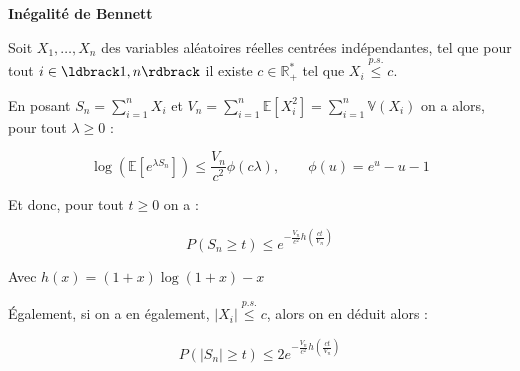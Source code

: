 \documentclass[12pt]{article}
\newcommand{\petitespace}{\vspace{0.5cm}}
\newcommand{\bb}[1]{\mathbb{#1}} %
\newcommand{\R}{\bb{R}} %
\newcommand{\somme}[2]{\sum\limits_{#1}^{#2}}
\newcommand{\Xunan}{X_1,\ldots,X_n} %
\newcommand{\esp}[1]{\bb{ E} \mathopen{}\left[#1\right]} %
\newcommand{\Var}[1]{\bb{ V} \mathopen{}\left(#1\right)} %
\newcommand{\1}{\bb{1}} %
\begin{document}
\textbf{Inégalité de Bennett}\petitespace

Soit $\Xunan$ des variables aléatoires réelles centrées indépendantes, tel que pour tout $i \in \ldbrack 1,n\rdbrack$ il existe $c\in \R_+^*$ tel que $X_i \overset{p.s.}{\le} c$. 

En posant $S_n = \somme{i=1}{n} X_i$ et $V_n = \somme{i=1}{n} \esp{X_i^2} =  \somme{i=1}{n} \Var{X_i} $ on a alors, pour tout $\lambda \ge 0$ :

$$\log(\esp{e^{\lambda S_n}} )  \le \frac{V_n}{c^2}\phi(c\lambda), \quad \quad \phi(u) = e^{u}-u-1 $$

Et donc, pour tout $t \ge 0$ on a :

$$P(S_n \ge t ) \le e^{-\frac{V_n}{c^2}h(\frac{ct}{V_n})}$$

Avec $h(x) = (1+x)\log(1+x)-x$\petitespace

Également, si on a en également, $|X_i|  \overset{p.s.}{\le} c$, alors on en déduit alors :

$$P(| S_n | \ge t ) \le 2e^{-\frac{V_n}{c^2}h(\frac{ct}{V_n})} $$




\petitespace
\end{document}
